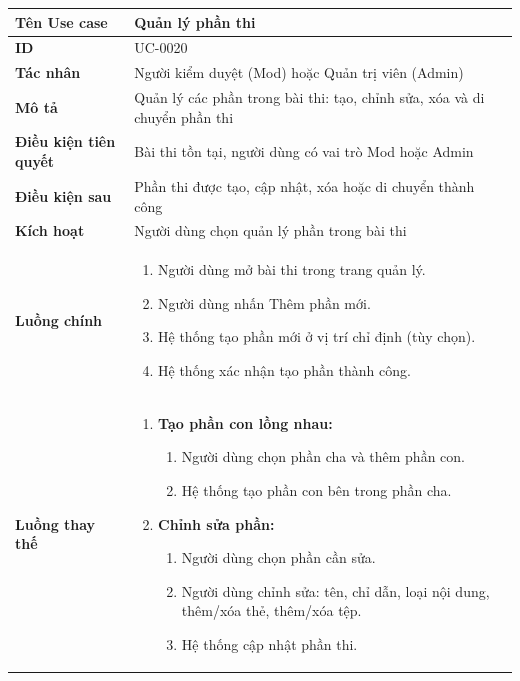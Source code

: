 {
\renewcommand{\arraystretch}{1.5}

\begin{tabularx}{\textwidth}{|>{\raggedright\arraybackslash}X|>{\raggedright\arraybackslash}X|}
\hline
\textbf{Tên Use case} & Quản lý phần thi \\
\hline
\textbf{ID} & UC-0020 \\
\hline
\textbf{Tác nhân} & Người kiểm duyệt (Mod) hoặc Quản trị viên (Admin) \\
\hline
\textbf{Mô tả} & Quản lý các phần trong bài thi: tạo, chỉnh sửa, xóa và di chuyển phần thi \\
\hline
\textbf{Điều kiện tiên quyết} & Bài thi tồn tại, người dùng có vai trò Mod hoặc Admin \\
\hline
\textbf{Điều kiện sau} & Phần thi được tạo, cập nhật, xóa hoặc di chuyển thành công \\
\hline
\textbf{Kích hoạt} & Người dùng chọn quản lý phần trong bài thi \\
\hline
\textbf{Luồng chính} &
\begin{enumerate}
    \item Người dùng mở bài thi trong trang quản lý.
    \item Người dùng nhấn Thêm phần mới.
    \item Hệ thống tạo phần mới ở vị trí chỉ định (tùy chọn).
    \item Hệ thống xác nhận tạo phần thành công.
\end{enumerate} \\
\hline
\textbf{Luồng thay thế} &
\begin{enumerate}
    \item \textbf{Tạo phần con lồng nhau:}
    \begin{enumerate}
        \item[2A.] Người dùng chọn phần cha và thêm phần con.
        \item[3A.] Hệ thống tạo phần con bên trong phần cha.
    \end{enumerate}
    \item \textbf{Chỉnh sửa phần:}
    \begin{enumerate}
        \item[2B.] Người dùng chọn phần cần sửa.
        \item[3B.] Người dùng chỉnh sửa: tên, chỉ dẫn, loại nội dung, thêm/xóa thẻ, thêm/xóa tệp.
        \item[4B.] Hệ thống cập nhật phần thi.
    \end{enumerate}

\end{enumerate}
\end{tabularx}}
